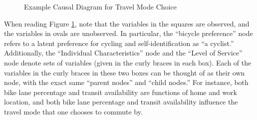 \begin{figure}[h!]
\begin{centering}

\caption{Example Causal Diagram for Travel Mode Choice}
\label{fig:bike-causal-diagram}

\end{centering}
\end{figure}

When reading Figure \ref{fig:bike-causal-diagram}, note that the variables in the squares are observed, and the variables in ovals are unobserved. In particular, the ``bicycle preference'' node refers to a latent preference for cycling and self-identification as ``a cyclist.'' Additionally, the ``Individual Characteristics'' node and the ``Level of Service'' node denote sets of variables (given in the curly braces in each box). Each of the variables in the curly braces in these two boxes can be thought of as their own node, with the exact same ``parent nodes'' and ``child nodes.'' For instance, both bike lane percentage and transit availability are functions of home and work location, and both bike lane percentage and transit availability influence the travel mode that one chooses to commute by.

